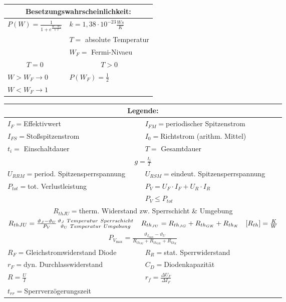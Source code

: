 \begin{table}[H]
    \begin{tabularx}{\columnwidth}{|X|X|}
        \hline
        \multicolumn{2}{|c|}{\textbf{Besetzungswahrscheinlichkeit:}}\\
        \hline
        $P(W)=\frac{1}{1+e^{\frac{W-W_F}{k\cdot T}}}$ & $k=1,38\cdot 10^{-23}\frac{Ws}{K}$ \\
        & $T=$ absolute Temperatur \\
        & $W_F=$ Fermi-Nivaeu \\
        \hline
        \multicolumn{1}{|c|}{$T=0$}                   & \multicolumn{1}{c|}{$T>0$} \\
        $W>W_F\rightarrow 0$                          & $P(W_F)=\frac{1}{2}$\\
        $W<W_F\rightarrow 1$                          & \\
        \hline
    \end{tabularx}
\end{table}
\begin{table}[H]
    \begin{tabularx}{\textwidth}{|X X|}
        \hline
        \multicolumn{2}{|c|}{\textbf{Legende:}}\\
        \hline
        $I_F=$Effektivwert                      & $I_{FM}=$periodischer Spitzenstrom \\
        $I_{FS}=$Stoßspitzenstrom               & $I_0=$Richtstrom (arithm. Mittel)\\
        $t_i=$ Einschaltdauer                   & $T=$ Gesamtdauer \\
        \multicolumn{2}{|c|}{$g=\frac{t_i}{T}$}\\
        $U_{RRM}=$period. Spitzensperrspannung  & $U_{RSM}=$eindeut. Spitzensperrspannung \\
        $P_{tot}=$tot. Verlustleistung          & $P_V=U_F\cdot I_F + U_R\cdot I_R$ \\
        & $P_V\leq P_{tot}$ \\
        \multicolumn{2}{|c|}{$R_{th JU}=$therm. Widerstand zw. Sperrschicht \& Umgebung}\\
        \multicolumn{2}{|c|}{$R_{th JU}=\frac{\vartheta_J-\vartheta_U}{P_V} \bfrac{\vartheta_J\ Temperatur\ Sperrschicht}{\vartheta_U\ Temperatur\ Umgebung}\quad
        R_{th_{JU}}=R_{th_{JG}}+R_{th_{GK}}+R_{th_{K}}\quad [R_{th}]=\frac{K}{W}$}\\
        \multicolumn{2}{|c|}{$P_{V_{\max}}=\frac{\vartheta_{I_{\max}}-\vartheta_U}{R_{th_{JG}}+R_{th_{GK}}+R_{th_{K}}}$}\\
        $R_F=$Gleichstromwiderstand Diode       & $R_R=$stat. Sperrwiderstand \\
        $r_F=$dyn. Durchlasswiderstand          & $C_D=$Diodenkapazität \\
        $R=\frac{U}{I}$                         & $r_f=\frac{\Delta U_F}{\Delta I_F}$ \\
        $t_{rr}=$Sperrverzögerungszeit          & \\
        \hline
    \end{tabularx}
\end{table}
